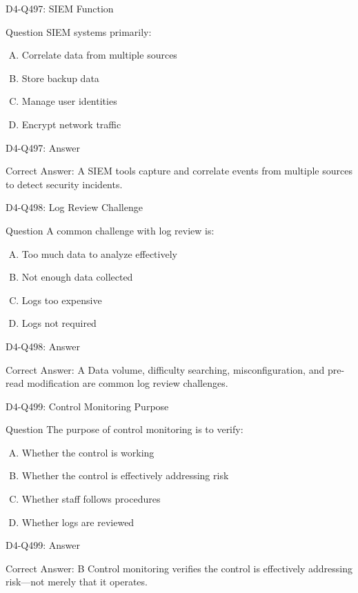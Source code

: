 \documentclass{beamer}
\begin{document}
\begin{frame}{D4-Q497: SIEM Function}
	\begin{block}{Question}
		SIEM systems primarily:
	\end{block}
	\begin{enumerate}[(A)]
		\item Correlate data from multiple sources
		\item Store backup data
		\item Manage user identities
		\item Encrypt network traffic
	\end{enumerate}
\end{frame}
\begin{frame}{D4-Q497: Answer}
	\begin{block}{Correct Answer: A}
		SIEM tools capture and correlate events from multiple sources to detect security incidents.
	\end{block}
\end{frame}

\begin{frame}{D4-Q498: Log Review Challenge}
	\begin{block}{Question}
		A common challenge with log review is:
	\end{block}
	\begin{enumerate}[(A)]
		\item Too much data to analyze effectively
		\item Not enough data collected
		\item Logs too expensive
		\item Logs not required
	\end{enumerate}
\end{frame}
\begin{frame}{D4-Q498: Answer}
	\begin{block}{Correct Answer: A}
		Data volume, difficulty searching, misconfiguration, and pre-read modification are common log review challenges.
	\end{block}
\end{frame}

\begin{frame}{D4-Q499: Control Monitoring Purpose}
	\begin{block}{Question}
		The purpose of control monitoring is to verify:
	\end{block}
	\begin{enumerate}[(A)]
		\item Whether the control is working
		\item Whether the control is effectively addressing risk
		\item Whether staff follows procedures
		\item Whether logs are reviewed
	\end{enumerate}
\end{frame}
\begin{frame}{D4-Q499: Answer}
	\begin{block}{Correct Answer: B}
		Control monitoring verifies the control is effectively addressing risk—not merely that it operates.
	\end{block}
\end{frame}
\end{document}
